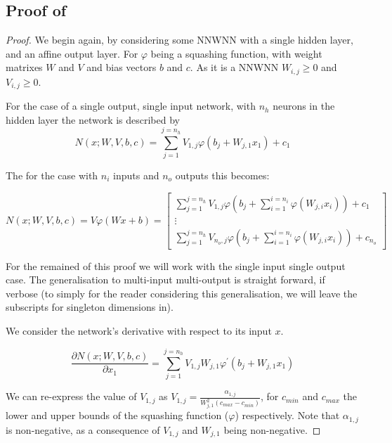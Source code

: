 \documentclass{article} %
\begin{document}
\subsection{Proof of }
\begin{proof}


We begin again, by considering some NNWNN with a single hidden layer, and an affine output layer.
For $\varphi$ being a squashing function, with weight matrixes $W$ and $V$ and bias vectors $b$ and $c$.
As it is a NNWNN $W_{i,j} \ge 0$ and $V_{i,j} \ge 0$.

For the case of a single output, single input network, with $n_h$ neurons in the hidden layer the network is described by
\begin{equation}
N(x;W,V,b,c) = \sum_{j=1}^{j=n_h} V_{1,j} \varphi (b_j+W_{j,1}x_1) + c_1
\end{equation}

The for the case with $n_i$ inputs and $n_o$ outputs this becomes:

\begin{equation}
N(x;W,V,b,c)=V\varphi(Wx+b)=\left[\begin{array}{c}
{\displaystyle \sum_{j=1}^{j=n_{h}}}V_{1,j}\varphi\left(b_{j}+\sum_{i=1}^{i=n_{i}}\varphi\left(W_{j,i}x_{i}\right)\right) + c_1\\
\vdots\\
{\displaystyle \sum_{j=1}^{j=n_{h}}}V_{n_{o},j}\varphi\left(b_{j}+\sum_{i=1}^{i=n_{i}}\varphi\left(W_{j,i}x_{i}\right)\right) +c_{n_o}
\end{array}\right]
\end{equation}

For the remained of this proof we will work with the single input single output case.
The generalisation to multi-input multi-output is straight forward, if verbose (to simply for the reader considering this generalisation, we will leave the subscripts for singleton dimensions in).

We consider the network's derivative with respect to its input $x$.

\begin{equation}
\frac{\partial N(x;W,V,b,c)}{\partial x_1} = \sum_{j=1}^{j=n_h} V_{1,j}W_{j,1} \varphi^\prime (b_j+W_{j,1}x_1)
\end{equation}

We can re-express the value of $V_{1,j}$ as $V_{1,j}=\frac{\alpha_{1,j}}{W_{j,1}^2(c_{max}-c_{min})}$,
for $c_{min}$ and $c_{max}$ the lower and upper bounds of the squashing function ($\varphi$) respectively.
Note that $\alpha_{1,j}$ is non-negative, as a consequence of $V_{1,j}$ and $W_{j,1}$ being non-negative.


\end{proof}
\end{document}

